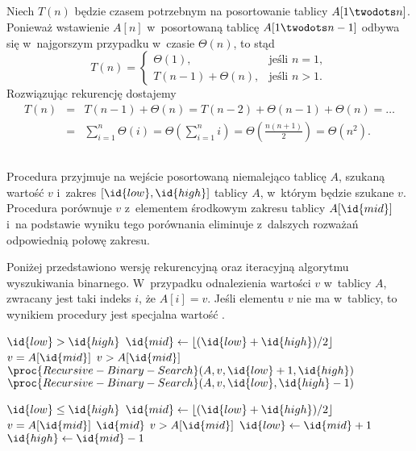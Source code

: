 \subsection{} %
Niech $T(n)$ będzie czasem potrzebnym na posortowanie tablicy $A[1\twodots n]$. Ponieważ wstawienie $A[n]$ w~posortowaną tablicę $A[1\twodots n-1]$ odbywa się w~najgorszym przypadku w~czasie $\Theta(n)$, to stąd
\[
	T(n) = \left\{\begin{array}{ll}
		\Theta(1), & \mbox{jeśli } n=1, \\
		T(n-1)+\Theta(n), & \mbox{jeśli } n>1.
	\end{array}\right.
\]
Rozwiązując rekurencję dostajemy
\begin{eqnarray*}
	T(n) &=& T(n-1)+\Theta(n) = T(n-2)+\Theta(n-1)+\Theta(n) = \dots \\
	&=& \sum_{i=1}^n\Theta(i) = \Theta\left(\sum_{i=1}^ni\right) = \Theta\left(\frac{n(n+1)}{2}\right) = \Theta(n^2).
\end{eqnarray*}

\subsection{} %
Procedura  przyjmuje na wejście posortowaną niemalejąco tablicę $A$, szukaną wartość $v$ i~zakres $[\id{low}, \id{high}]$ tablicy $A$, w~którym będzie szukane $v$. Procedura porównuje $v$ z~elementem środkowym zakresu tablicy $A[\id{mid}]$ i~na podstawie wyniku tego porównania eliminuje z~dalszych rozważań odpowiednią połowę zakresu.

Poniżej przedstawiono wersję rekurencyjną oraz iteracyjną algorytmu wyszukiwania binarnego. W~przypadku odnalezienia wartości $v$ w~tablicy $A$, zwracany jest taki indeks $i$, że $A[i]=v$. Jeśli elementu $v$ nie ma w~tablicy, to wynikiem procedury jest specjalna wartość .

\begin{codebox}
\li	\If $\id{low}>\id{high}$
\li		\Then
			\Return {}
		\End
\li	$\id{mid}\gets \left\lfloor(\id{low}+\id{high})/2\right\rfloor$
\li	\If $v=A[\id{mid}]$
\li		\Then
			\Return {}
		\End
\li	\If $v>A[\id{mid}]$
\li		\Then
			\Return $\proc{Recursive-Binary-Search}(A,v,\id{low}+1,\id{high})$
\li		\Else
			\Return $\proc{Recursive-Binary-Search}(A,v,\id{low},\id{high}-1)$
		\End
\end{codebox}

\begin{codebox}
\li	\While $\id{low}\le \id{high}$
\li		\Do
			$\id{mid}\gets \left\lfloor(\id{low}+\id{high})/2\right\rfloor$
\li			\If $v=A[\id{mid}]$
\li				\Then
					\Return $\id{mid}$
				\End
\li			\If $v>A[\id{mid}]$
\li				\Then
					$\id{low}\gets \id{mid}+1$
\li				\Else
					$\id{high}\gets \id{mid}-1$
				\End
		\End
\li	\Return {}
\end{codebox}

